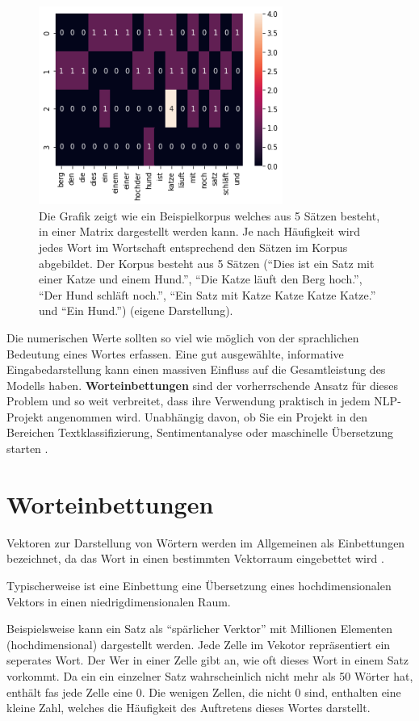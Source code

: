 \begin{figure}[H]
    \centering
    \includegraphics[width=8cm]{kapitel3/onhot.png}
    \caption[One-Hot-Codierung als Eingabematrix]{Die Grafik zeigt wie ein Beispielkorpus welches aus 5 Sätzen besteht, in einer Matrix dargestellt werden kann. Je nach Häufigkeit wird jedes Wort im Wortschaft entsprechend den Sätzen im Korpus abgebildet. Der Korpus besteht aus 5 Sätzen (\enquote{Dies ist ein Satz mit einer Katze und einem Hund.}, \enquote{Die Katze läuft den Berg hoch.}, \enquote{Der Hund schläft noch.}, \enquote{Ein Satz mit Katze Katze Katze Katze.} und \enquote{Ein Hund.}) (eigene Darstellung).}
    \label{OneHotGrafik}
\end{figure}

Die numerischen Werte sollten so viel wie möglich von der sprachlichen Bedeutung eines Wortes erfassen. Eine gut ausgewählte, informative Eingabedarstellung kann einen massiven Einfluss auf die Gesamtleistung des Modells haben. \textbf{Worteinbettungen} sind der vorherrschende Ansatz für dieses Problem und so weit verbreitet, dass ihre Verwendung praktisch in jedem NLP-Projekt angenommen wird. Unabhängig davon, ob Sie ein Projekt in den Bereichen Textklassifizierung, Sentimentanalyse oder maschinelle Übersetzung starten \cite*{Lecun2015}.



\section{Worteinbettungen}
Vektoren zur Darstellung von Wörtern werden im Allgemeinen als Einbettungen bezeichnet, da das Wort in einen bestimmten Vektorraum eingebettet wird \cite*[99]{Jurafskya}.

Typischerweise ist eine Einbettung eine Übersetzung eines hochdimensionalen Vektors in einen niedrigdimensionalen Raum. 

Beispielsweise kann ein Satz als \enquote{spärlicher Verktor} mit Millionen Elementen (hochdimensional) dargestellt werden. Jede Zelle im Vekotor repräsentiert ein seperates Wort. Der Wer in einer Zelle gibt an, wie oft dieses Wort in einem Satz vorkommt. Da ein ein einzelner Satz wahrscheinlich nicht mehr als 50 Wörter hat, enthält fas jede Zelle eine 0. Die wenigen Zellen, die nicht 0 sind, enthalten eine kleine Zahl, welches die Häufigkeit des Auftretens dieses Wortes darstellt.

